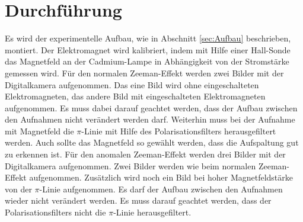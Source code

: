 
\section{Durchführung}
\label{sec:Durchführung}
Es wird der experimentelle Aufbau, wie in Abschnitt \ref{sec:Aufbau} beschrieben, montiert. Der Elektromagnet wird kalibriert, indem mit Hilfe einer Hall-Sonde das Magnetfeld an der Cadmium-Lampe in Abhängigkeit von der Stromstärke gemessen wird. Für den normalen Zeeman-Effekt werden zwei Bilder mit der Digitalkamera aufgenommen. Das eine Bild wird ohne eingeschalteten Elektromagneten, das andere Bild mit eingeschalteten Elektromagneten aufgenommen. Es muss dabei darauf geachtet werden, dass der Aufbau zwischen den Aufnahmen nicht verändert werden darf. Weiterhin muss bei der Aufnahme mit Magnetfeld die $\pi$-Linie mit Hilfe des Polarisationsfilters herausgefiltert werden. Auch sollte das Magnetfeld so gewählt werden, dass die Aufspaltung gut zu erkennen ist. Für den anomalen Zeeman-Effekt werden drei Bilder mit der Digitalkamera aufgenommen. Zwei Bilder werden wie beim normalen Zeeman-Effekt aufgenommen. Zusätzlich wird noch ein Bild bei hoher Magnetfeldstärke von der $\pi$-Linie aufgenommen. Es darf der Aufbau zwischen den Aufnahmen wieder nicht verändert werden. Es muss darauf geachtet werden, dass der Polarisationsfilters nicht die $\pi$-Linie herausgefiltert.
